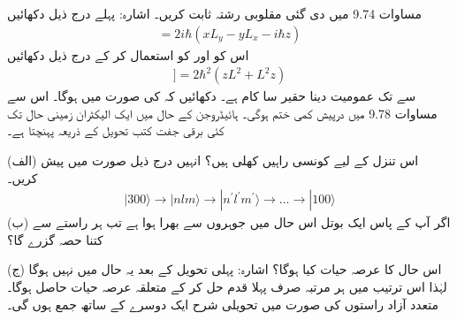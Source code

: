 مساوات \num{9.74} میں دی گئی  مقلوبی  رشتہ ثابت کریں۔ اشارہ: پہلے درج ذیل دکھائیں
\begin{align*}
	[L^2, z] = 2i\hbar(xL_y-yL_x-i\hbar z)
\end{align*}
اس کو اور  کو استعمال کر کے درج ذیل دکھائیں
\begin{align*}
[L^2, [L^2, z]] = 2\hbar^2(zL^2+L^2z)	
\end{align*}
 سے  تک عمومیت دینا حقیر سا  کام ہے۔
دکھائیں کہ  کی صورت میں  ہوگا۔ اس سے مساوات \num{9.78} میں درپیش کمی ختم ہوگی۔
ہائیڈروجن کے  حال میں ایک الیکٹران زمینی حال تک کئی برقی جفت کتب تحویل کے ذریعہ  پہنچتا ہے۔

(الف) اس تنزل کے لیے کونسی راہیں کھلی ہیں؟ انہیں درج ذیل صورت میں پیش کریں۔
\begin{align*}
	|300\rangle\rightarrow | nlm\rangle\rightarrow | n^\prime l^\prime m^\prime \rangle\rightarrow\dots\rightarrow|100\rangle
\end{align*}
(ب) اگر آپ کے پاس ایک بوتل اس حال میں جوہروں سے بھرا ہوا ہے تب ہر راستے سے کتنا حصہ گزرے گا؟

(ج) اس حال کا عرصہ حیات کیا ہوگا؟ اشارہ: پہلی تحویل کے بعد یہ حال  میں نہیں ہوگا لہٰذا اس ترتیب میں ہر  مرتبہ  صرف پہلا قدم حل کر کے متعلقہ عرصہ حیات حاصل ہوگا۔ متعدد آزاد راستوں کی صورت میں تحویلی شرح ایک دوسرے کے ساتھ جمع ہوں گی۔

